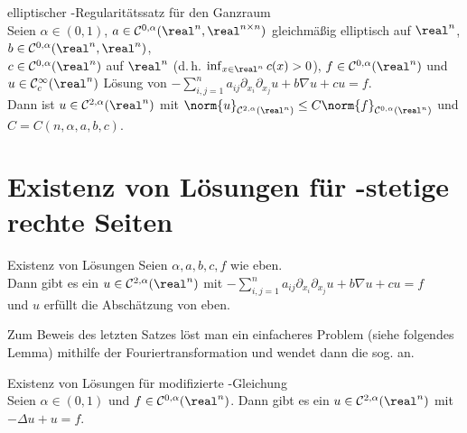 \begin{Satz}{elliptischer -Regularitätssatz für den Ganzraum}\\
    Seien $\alpha \in (0, 1)$,
    $a \in \C^{0,\alpha}(\real^n, \real^{n \times n})$
    gleichmäßig elliptisch auf $\real^n$,
    $b \in \C^{0,\alpha}(\real^n, \real^n)$,\\
    $c \in \C^{0,\alpha}(\real^n)$  auf $\real^n$
    (d.\,h. $\inf_{x \in \real^n} c(x) > 0$),
    $f \in \C^{0,\alpha}(\real^n)$ und\\
    $u \in \C^\infty_c(\real^n)$ Lösung von
    $-\sum_{i,j=1}^n a_{ij} \partial_{x_i} \partial_{x_j} u + b \nabla u + cu = f$.\\
    Dann ist $u \in \C^{2,\alpha}(\real^n)$ mit
    $\norm{u}_{\C^{2,\alpha}(\real^n)} \le C \norm{f}_{\C^{0,\alpha}(\real^n)}$ und
    $C = C(n, \alpha, a, b, c)$.
\end{Satz}

\section{%
    Existenz von Lösungen für -stetige rechte Seiten%
}

\begin{Satz}{Existenz von Lösungen}
    Seien $\alpha, a, b, c, f$ wie eben.\\
    Dann gibt es ein $u \in \C^{2,\alpha}(\real^n)$ mit
    $-\sum_{i,j=1}^n a_{ij} \partial_{x_i} \partial_{x_j} u + b \nabla u + cu = f$\\
    und $u$ erfüllt die Abschätzung von eben.
\end{Satz}

\linie

\begin{Bem}
    Zum Beweis des letzten Satzes löst man ein einfacheres Problem (siehe folgendes Lemma)
    mithilfe der Fouriertransformation und wendet dann die sog.  an.
\end{Bem}

\begin{Lemma}{Existenz von Lösungen für modifizierte -Gleichung}\\
    Seien $\alpha \in (0, 1)$ und $f \in \C^{0,\alpha}(\real^n)$.
    Dann gibt es ein $u \in \C^{2,\alpha}(\real^n)$ mit
    $-\Delta u + u = f$.
\end{Lemma}

